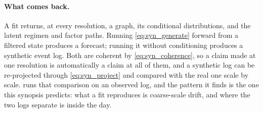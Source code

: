 \paragraph{What comes back.}
A fit returns, at every resolution, a graph, its conditional distributions, and
the latent regimen and factor paths. Running \cref{eq:syn_generate} forward
from a filtered state produces a forecast; running it without conditioning
produces a synthetic event log. Both are coherent by \cref{eq:syn_coherence},
so a claim made at one resolution is automatically a claim at all of them, and
a synthetic log can be re-projected through \cref{eq:syn_project} and compared
with the real one scale by scale.  runs that comparison
on an observed log, and the pattern it finds is the one this synopsis predicts:
what a fit reproduces is coarse-scale drift, and where the two logs separate is
inside the day.
